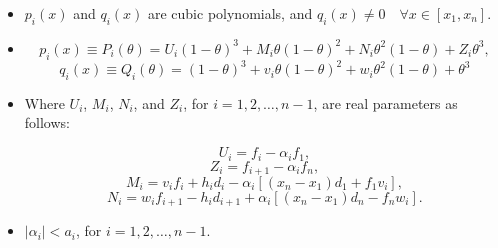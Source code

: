 \documentclass{beamer}
\begin{document}
        \begin{frame}
        \begin{itemize}
        \item \( p_i(x) \) and \( q_i(x) \) are cubic polynomials, and \( q_i(x) \neq 0 \quad \forall x \in [x_1, x_n] \).
        \item \[
p_i(x) \equiv P_i(\theta) = U_i (1 - \theta)^3 + M_i \theta (1 - \theta)^2 + N_i \theta^2 (1 - \theta) + Z_i \theta^3,
\]
\[
q_i(x) \equiv Q_i(\theta) = (1 - \theta)^3 + v_i \theta (1 - \theta)^2 + w_i \theta^2 (1 - \theta) + \theta^3
\]
\item Where \( U_i \), \( M_i \), \( N_i \), and \( Z_i \), for \( i = 1, 2, \dots, n - 1 \), are real parameters  as follows:

\[
U_i = f_i - \alpha_i f_1,
\]
\[
Z_i = f_{i+1} - \alpha_i f_n,
\]
\[
M_i = v_i f_i + h_i d_i - \alpha_i \left[(x_n - x_1) d_1 + f_1 v_i\right],
\]
\[
N_i = w_i f_{i+1} - h_i d_{i+1} + \alpha_i \left[(x_n - x_1) d_n - f_n w_i\right].
\]


        \item \( |\alpha_i| < a_i \), for \( i = 1, 2, \ldots, n - 1 \).
    \end{itemize}
\end{frame}
\end{document}

